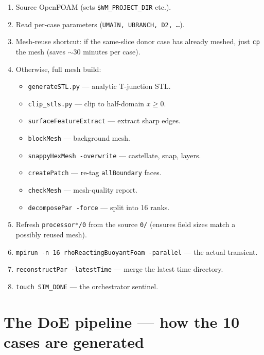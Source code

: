 \documentclass[11pt,a4paper]{article}
\begin{document}
\begin{enumerate}[leftmargin=1.5em,topsep=2pt]
    \item Source OpenFOAM (sets \texttt{\$WM\_PROJECT\_DIR} etc.).
    \item Read per-case parameters (\texttt{UMAIN, UBRANCH, D2, \dots}).
    \item Mesh-reuse shortcut: if the same-slice donor case has
    already meshed, just \texttt{cp} the mesh (saves $\sim 30$ minutes
    per case).
    \item Otherwise, full mesh build:
    \begin{itemize}[leftmargin=1em,topsep=1pt]
        \item \texttt{generateSTL.py} --- analytic T-junction STL.
        \item \texttt{clip\_stls.py} --- clip to half-domain $x\ge 0$.
        \item \texttt{surfaceFeatureExtract} --- extract sharp edges.
        \item \texttt{blockMesh} --- background mesh.
        \item \texttt{snappyHexMesh -overwrite} --- castellate, snap, layers.
        \item \texttt{createPatch} --- re-tag \texttt{allBoundary} faces.
        \item \texttt{checkMesh} --- mesh-quality report.
        \item \texttt{decomposePar -force} --- split into 16 ranks.
    \end{itemize}
    \item Refresh \texttt{processor*/0} from the source \texttt{0/}
    (ensures field sizes match a possibly reused mesh).
    \item \texttt{mpirun -n 16 rhoReactingBuoyantFoam -parallel} ---
    the actual transient.
    \item \texttt{reconstructPar -latestTime} --- merge the latest
    time directory.
    \item \texttt{touch SIM\_DONE} --- the orchestrator sentinel.
\end{enumerate}

\clearpage
\section{The DoE pipeline --- how the 10 cases are generated}
\end{document}
